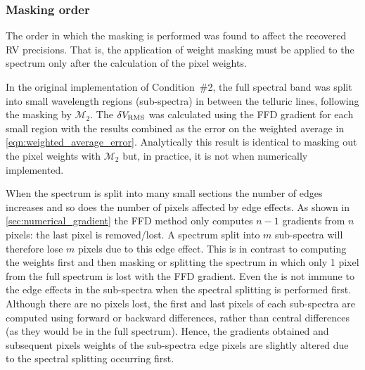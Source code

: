 \subsubsection{Masking order}
\label{subsubsec:masking_order}
The order in which the masking is performed was found to affect the recovered {RV} precisions.
That is, the application of weight masking must be applied to the spectrum only after the calculation of the pixel weights.

In the original implementation of Condition~\#2, the full spectral band was split into small wavelength regions (sub-spectra) in between the telluric lines, following the masking by \(\mathcal{M}_{2}\).
The \(\delta V_{\textrm{RMS}}\) was calculated using the {FFD} gradient for each small region with the results combined as the error on the weighted average in \cref{eqn:weighted_average_error}.
Analytically this result is identical to masking out the pixel weights with \({\mathcal{M}}_{2}\) but, in practice, it is not when numerically implemented.

When the spectrum is split into many small sections the number of edges increases and so does the number of pixels affected by edge effects.
As shown in \cref{sec:numerical_gradient} the {FFD} method only computes \(n-1\) gradients from \(n\) pixels: the last pixel is removed/lost.
A spectrum split into \(m\) sub-spectra will therefore lose \(m\) pixels due to this edge effect.
This is in contrast to computing the weights first and then masking or splitting the spectrum in which only 1 pixel from the full spectrum is lost with the {FFD} gradient.
Even the \npgradient{} is not immune to the edge effects in the sub-spectra when the spectral splitting is performed first.
Although there are no pixels lost, the first and last pixels of each sub-spectra are computed using forward or backward differences, rather than central differences (as they would be in the full spectrum).
Hence, the gradients obtained and subsequent pixels weights of the sub-spectra edge pixels are slightly altered due to the spectral splitting occurring first.

